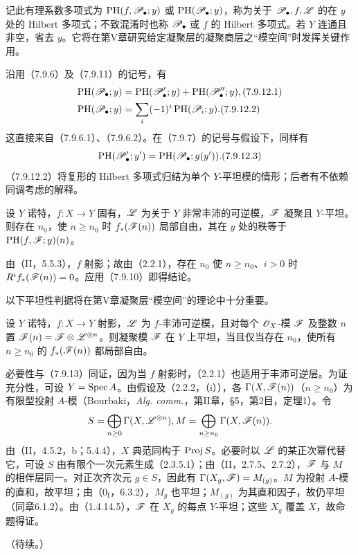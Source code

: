 记此有理系数多项式为 $\operatorname{PH}(f,\mathscr P_\bullet;y)$ 或 $\operatorname{PH}(\mathscr P_\bullet;y)$，称为关于 $\mathscr P_\bullet,f,\mathscr L$ 的在 $y$ 处的 Hilbert 多项式；不致混淆时也称 $\mathscr P_\bullet$ 或 $f$ 的 Hilbert 多项式。若 $Y$ 连通且非空，省去 $y$。它将在第V章研究给定凝聚层的凝聚商层之“模空间”时发挥关键作用。

沿用（7.9.6）及（7.9.11）的记号，有
\begin{align}
 \operatorname{PH}(\PP_\bullet;y)
 &=\operatorname{PH}(\PP'_\bullet;y)+\operatorname{PH}(\PP''_\bullet;y),\tag{7.9.12.1}\\
 \operatorname{PH}(\PP_\bullet;y)
 &=\sum_i(-1)^i\operatorname{PH}(\PP_i;y).\tag{7.9.12.2}
\end{align}
这直接来自（7.9.6.1）、（7.9.6.2）。在（7.9.7）的记号与假设下，同样有
\begin{equation}
 \operatorname{PH}(\PP'_\bullet;y')
 =\operatorname{PH}(\PP_\bullet;g(y')).\tag{7.9.12.3}
\end{equation}
（7.9.12.2）将复形的 Hilbert 多项式归结为单个 $Y$-平坦模的情形；后者有不依赖同调考虑的解释。

设 $Y$ 诺特，$f:X\to Y$ 固有，$\mathscr L$ 为关于 $Y$ 非常丰沛的可逆模，$\mathscr F$ 凝聚且 $Y$-平坦。则存在 $n_0$，使 $n\geq n_0$ 时 $f_*(\mathscr F(n))$ 局部自由，其在 $y$ 处的秩等于 $\operatorname{PH}(f,\mathscr F;y)(n)$。

由（II，5.5.3），$f$ 射影；故由（2.2.1），存在 $n_0$ 使 $n\geq n_0$、$i>0$ 时 $R^if_*(\mathscr F(n))=0$。应用（7.9.10）即得结论。

以下平坦性判据将在第V章凝聚层“模空间”的理论中十分重要。

设 $Y$ 诺特，$f:X\to Y$ 射影，$\mathscr L$ 为 $f$-丰沛可逆模，且对每个 $\mathscr O_X$-模 $\mathscr F$ 及整数 $n$ 置 $\mathscr F(n)=\mathscr F\otimes\mathscr L^{\otimes n}$。则凝聚模 $\mathscr F$ 在 $Y$ 上平坦，当且仅当存在 $n_0$，使所有 $n\geq n_0$ 的 $f_*(\mathscr F(n))$ 都局部自由。

必要性与（7.9.13）同证，因为当 $f$ 射影时，（2.2.1）也适用于丰沛可逆层。为证充分性，可设 $Y=\operatorname{Spec} A$。由假设及（2.2.2，（i）），各 $\Gamma(X,\mathscr F(n))$（$n\geq n_0$）为有限型投射 $A$-模（Bourbaki，\textit{Alg. comm.}，第II章，§5，第2目，定理1）。令
\[
 S=\bigoplus_{n\geq0}\Gamma(X,\mathscr L^{\otimes n}),
 M=\bigoplus_{n\geq n_0}\Gamma(X,\mathscr F(n)).
\]
由（II，4.5.2，b；5.4.4），$X$ 典范同构于 $\operatorname{Proj} S$。必要时以 $\mathscr L$ 的某正次幂代替它，可设 $S$ 由有限个一次元素生成（2.3.5.1）；由（II，2.7.5、2.7.2），$\mathscr F$ 与 $M$ 的相伴层同一。对正次齐次元 $g\in S$，因此有 $\Gamma(X_g,\mathscr F)=M_{(g)}$。$M$ 为投射 $A$-模的直和，故平坦；由（$0_{\mathrm I}$，6.3.2），$M_g$ 也平坦；$M_{(g)}$ 为其直和因子，故仍平坦（同章6.1.2）。由（1.4.14.5），$\mathscr F$ 在 $X_g$ 的每点 $Y$-平坦；这些 $X_g$ 覆盖 $X$，故命题得证。

\begin{flushright}（待续。）\end{flushright}
